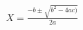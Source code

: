 \documentclass[preview]{standalone}
\begin{document}
\begin{align*}
X = \frac{-b \pm \sqrt{b^2 - 4ac)}}{2a}
\end{align*}
\end{document}
